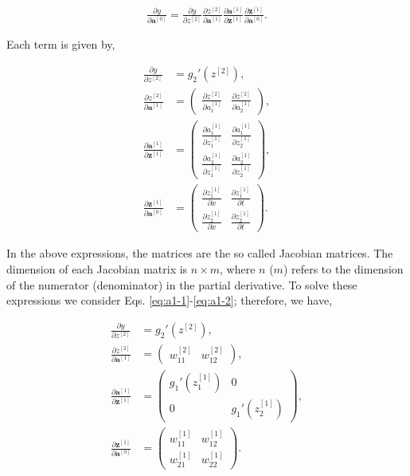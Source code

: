 \documentclass{article}
\begin{document}
\begin{align}
\label{dyda0}
\frac{\partial y}{\partial \textbf{a}^{[0]}} = \frac{\partial y}{\partial z^{[2]}} \frac{\partial z^{[2]}}{\partial \textbf{a}^{[1]}} \frac{\partial \textbf{a}^{[1]}}{\partial \textbf{z}^{[1]}}  \frac{\partial \textbf{z}^{[1]}}{\partial \textbf{a}^{[0]}}. 
\end{align}

Each term is given by,

\begin{align}
\frac{\partial y}{\partial z^{[2]}} &= g_2'(z^{[2]}),\\
\frac{\partial z^{[2]}}{\partial \textbf{a}^{[1]}} &=
\begin{pmatrix}
\frac{\partial z^{[2]}}{\partial a_1^{[1]}} & \frac{\partial z^{[2]}}{\partial a_2^{[1]}}
\end{pmatrix}, \\
\frac{\partial \textbf{a}^{[1]}}{\partial \textbf{z}^{[1]}} &=
\begin{pmatrix}
\frac{\partial a_1^{[1]}}{\partial z_1^{[1]}} & \frac{\partial a_1^{[1]}}{\partial z_2^{[1]}} \\
\frac{\partial a_2^{[1]}}{\partial z_1^{[1]}} & \frac{\partial a_2^{[1]}}{\partial z_2^{[1]}}
\end{pmatrix}, \\
\frac{\partial \textbf{z}^{[1]}}{\partial \textbf{a}^{[0]}} &=
\begin{pmatrix}
\frac{\partial z_1^{[1]}}{\partial x} & 
\frac{\partial z_1^{[1]}}{\partial t} \\
\frac{\partial z_2^{[1]}}{\partial x} &
\frac{\partial z_2^{[1]}}{\partial t}
\end{pmatrix}.
\end{align}

In the above expressions, the matrices are the so called Jacobian matrices. The dimension of each Jacobian matrix is $n \times m$, where $n$ ($m$) refers to the dimension of the numerator (denominator) in the partial derivative. To solve these expressions we consider Eqs. \eqref{eq:a1-1}-\eqref{eq:a1-2}; therefore, we have,

\begin{align}
\label{comp1}
\frac{\partial y}{\partial z^{[2]}} &= g_2'(z^{[2]}),\\
\frac{\partial z^{[2]}}{\partial \textbf{a}^{[1]}} &=
\begin{pmatrix}
w_{11}^{[2]} & w_{12}^{[2]} 
\end{pmatrix}, \\
\frac{\partial \textbf{a}^{[1]}}{\partial \textbf{z}^{[1]}} &=
\begin{pmatrix}
g_1'(z_1^{[1]}) & 0 \\
0 & g_1'(z_2^{[1]})
\end{pmatrix}, \\
\frac{\partial \textbf{z}^{[1]}}{\partial \textbf{a}^{[0]}} &=
\begin{pmatrix}
w_{11}^{[1]} & w_{12}^{[1]} \\
w_{21}^{[1]} & w_{22}^{[1]}
\end{pmatrix}.
\label{comp4}
\end{align}
\end{document}
